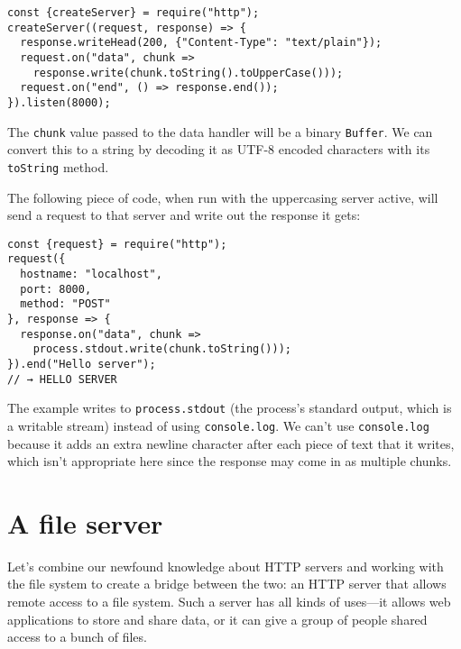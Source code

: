 \begin{lstlisting}
const {createServer} = require("http");
createServer((request, response) => {
  response.writeHead(200, {"Content-Type": "text/plain"});
  request.on("data", chunk =>
    response.write(chunk.toString().toUpperCase()));
  request.on("end", () => response.end());
}).listen(8000);
\end{lstlisting}
\noindent{}

The \lstinline`chunk` value passed to the data handler will be a binary \lstinline`Buffer`. We can convert this to a string by decoding it as UTF-8 encoded characters with its \lstinline`toString` method.

The following piece of code, when run with the uppercasing server active, will send a request to that server and write out the response it gets:

\begin{lstlisting}
const {request} = require("http");
request({
  hostname: "localhost",
  port: 8000,
  method: "POST"
}, response => {
  response.on("data", chunk =>
    process.stdout.write(chunk.toString()));
}).end("Hello server");
// → HELLO SERVER
\end{lstlisting}
\noindent{}

The example writes to \lstinline`process.stdout` (the process's standard output, which is a writable stream) instead of using \lstinline`console.log`. We can't use \lstinline`console.log` because it adds an extra newline character after each piece of text that it writes, which isn't appropriate here since the response may come in as multiple chunks.

\label{node.file_server}\section{A file server}

Let's combine our newfound knowledge about HTTP servers and working with the file system to create a bridge between the two: an HTTP server that allows remote access to a file system. Such a server has all kinds of uses—it allows web applications to store and share data, or it can give a group of people shared access to a bunch of files.

